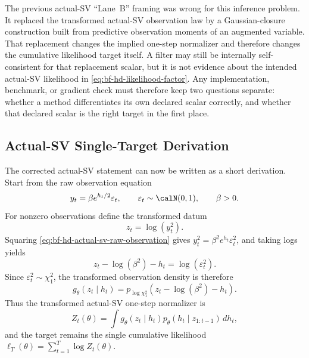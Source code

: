 The previous actual-SV ``Lane~B'' framing was wrong for this inference problem.
It replaced the transformed actual-SV observation law by a Gaussian-closure
construction built from predictive observation moments of an augmented variable.
That replacement changes the implied one-step normalizer and therefore changes
the cumulative likelihood target itself.  A filter may still be internally
self-consistent for that replacement scalar, but it is not evidence about the
intended actual-SV likelihood in \eqref{eq:bf-hd-likelihood-factor}.  Any
implementation, benchmark, or gradient check must therefore keep two questions
separate: whether a method differentiates its own declared scalar correctly, and
whether that declared scalar is the right target in the first place.

\subsection{Actual-SV Single-Target Derivation}
\label{sec:bf-hd-actual-sv-single-target-derivation}

The corrected actual-SV statement can now be written as a short derivation.
Start from the raw observation equation
\begin{equation}
  y_t=\beta e^{h_t/2}\varepsilon_t,
  \qquad
  \varepsilon_t\sim \calN(0,1),
  \qquad
  \beta>0.
  \label{eq:bf-hd-actual-sv-raw-observation}
\end{equation}
For nonzero observations define the transformed datum
\begin{equation}
  z_t=\log(y_t^2).
  \label{eq:bf-hd-actual-sv-z-definition}
\end{equation}
Squaring \eqref{eq:bf-hd-actual-sv-raw-observation} gives
\(
  y_t^2=\beta^2 e^{h_t}\varepsilon_t^2
\), and taking logs yields
\begin{equation}
  z_t-\log(\beta^2)-h_t
  =
  \log(\varepsilon_t^2).
  \label{eq:bf-hd-actual-sv-transform-identity}
\end{equation}
Since \(\varepsilon_t^2\sim\chi_1^2\), the transformed observation density is
therefore
\begin{equation}
  g_\theta(z_t\mid h_t)
  =
  p_{\log\chi_1^2}\!\left(z_t-\log(\beta^2)-h_t\right).
  \label{eq:bf-hd-actual-sv-transform-density}
\end{equation}
Thus the transformed actual-SV one-step normalizer is
\begin{equation}
  Z_t(\theta)
  =
  \int g_\theta(z_t\mid h_t)
  p_\theta(h_t\mid z_{1:t-1})\,dh_t,
  \label{eq:bf-hd-actual-sv-normalizer}
\end{equation}
and the target remains the single cumulative likelihood
\(
  \ell_T(\theta)=\sum_{t=1}^T\log Z_t(\theta)
\).

